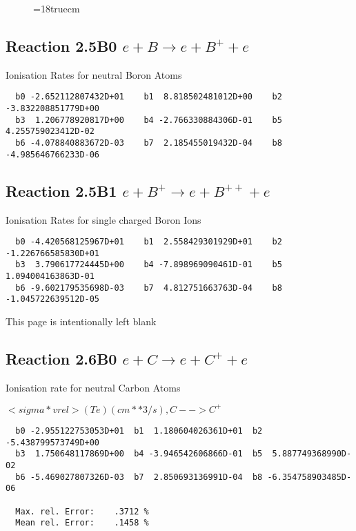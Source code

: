\begin{figure} \label{2.4B}
\epsfxsize=18truecm
\end{figure}
\newpage

\subsection{
Reaction 2.5B0   $e + B \rightarrow e + B^+ + e $
}

 Ionisation Rates for neutral Boron Atoms


\begin{verbatim}
  b0 -2.652112807432D+01    b1  8.818502481012D+00    b2 -3.832208851779D+00
  b3  1.206778920817D+00    b4 -2.766330884306D-01    b5  4.255759023412D-02
  b6 -4.078840883672D-03    b7  2.185455019432D-04    b8 -4.985646766233D-06
\end{verbatim}

\subsection{
Reaction 2.5B1   $e + B^+ \rightarrow e + B^{++} + e $
}

 Ionisation Rates for single charged Boron Ions


\begin{verbatim}
  b0 -4.420568125967D+01    b1  2.558429301929D+01    b2 -1.226766585830D+01
  b3  3.790617724445D+00    b4 -7.898969090461D-01    b5  1.094004163863D-01
  b6 -9.602179535698D-03    b7  4.812751663763D-04    b8 -1.045722639512D-05
\end{verbatim}

\newpage
This page is intentionally left blank
\newpage

\subsection{
Reaction 2.6B0   $e + C \rightarrow e + C^+ + e  $
}

  Ionisation rate for neutral Carbon Atoms

  $<sigma*vrel>(Te)  (cm**3/s), C --> C^+$

\begin{verbatim}
  b0 -2.955122753053D+01  b1  1.180604026361D+01  b2 -5.438799573749D+00
  b3  1.750648117869D+00  b4 -3.946542606866D-01  b5  5.887749368990D-02
  b6 -5.469027807326D-03  b7  2.850693136991D-04  b8 -6.354758903485D-06

  Max. rel. Error:    .3712 %
  Mean rel. Error:    .1458 %

\end{verbatim}
